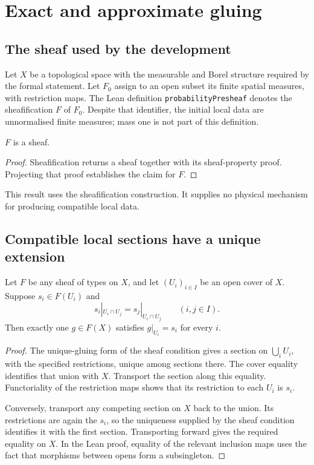 \section{Exact and approximate gluing}\label{sec:gluing}

\subsection{The sheaf used by the development}
Let $X$ be a topological space with the measurable and Borel structure required
by the formal statement. Let $F_0$ assign to an open subset its finite spatial
measures, with restriction maps. The Lean definition
\texttt{probabilityPresheaf} denotes the sheafification $F$ of $F_0$.
Despite that identifier, the initial local data are unnormalised finite
measures; mass one is not part of this definition.

\begin{claim}
$F$ is a sheaf.
\end{claim}
\begin{proof}
Sheafification returns a sheaf together with its sheaf-property proof.
Projecting that proof establishes the claim for $F$.
\end{proof}
\scope This result uses the sheafification construction. It supplies no
physical mechanism for producing compatible local data.

\subsection{Compatible local sections have a unique extension}
\begin{claim}
Let $F$ be any sheaf of types on $X$, and let $(U_i)_{i\in I}$ be an open
cover of $X$. Suppose $s_i\in F(U_i)$ and
\[
 s_i|_{U_i\cap U_j}=s_j|_{U_i\cap U_j}\qquad(i,j\in I).
\]
Then exactly one $g\in F(X)$ satisfies $g|_{U_i}=s_i$ for every $i$.
\end{claim}
\begin{proof}
The unique-gluing form of the sheaf condition gives a section on
$\bigcup_i U_i$, with the specified restrictions, unique among sections there.
The cover equality identifies that union with $X$. Transport the section along
this equality. Functoriality of the restriction maps shows that its restriction
to each $U_i$ is $s_i$.

Conversely, transport any competing section on $X$ back to the union. Its
restrictions are again the $s_i$, so the uniqueness supplied by the sheaf
condition identifies it with the first section. Transporting forward gives the
required equality on $X$. In the Lean proof, equality of the relevant inclusion
maps uses the fact that morphisms between opens form a subsingleton.
\end{proof}

